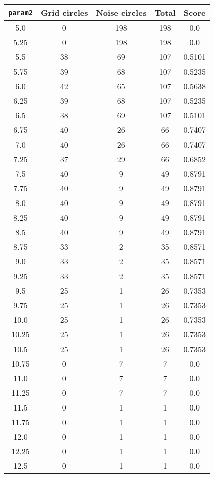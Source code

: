 \documentclass[letterpaper, 12pt]{article}
\begin{document}
\begin{longtable}{|c|c|c|c|c|}
\hline
\textbf{\texttt{param2}} & \textbf{Grid circles} & \textbf{Noise circles} & \textbf{Total} & \textbf{Score} \\
\hline
5.0 & 0 & 198 & 198 & 0.0 \\
\hline
5.25 & 0 & 198 & 198 & 0.0 \\
\hline
5.5 & 38 & 69 & 107 & 0.5101 \\
\hline
5.75 & 39 & 68 & 107 & 0.5235 \\
\hline
6.0 & 42 & 65 & 107 & 0.5638 \\
\hline
6.25 & 39 & 68 & 107 & 0.5235 \\
\hline
6.5 & 38 & 69 & 107 & 0.5101 \\
\hline
6.75 & 40 & 26 & 66 & 0.7407 \\
\hline
7.0 & 40 & 26 & 66 & 0.7407 \\
\hline
7.25 & 37 & 29 & 66 & 0.6852 \\
\hline
7.5 & 40 & 9 & 49 & 0.8791 \\
\hline
7.75 & 40 & 9 & 49 & 0.8791 \\
\hline
8.0 & 40 & 9 & 49 & 0.8791 \\
\hline
8.25 & 40 & 9 & 49 & 0.8791 \\
\hline
8.5 & 40 & 9 & 49 & 0.8791 \\
\hline
8.75 & 33 & 2 & 35 & 0.8571 \\
\hline
9.0 & 33 & 2 & 35 & 0.8571 \\
\hline
9.25 & 33 & 2 & 35 & 0.8571 \\
\hline
9.5 & 25 & 1 & 26 & 0.7353 \\
\hline
9.75 & 25 & 1 & 26 & 0.7353 \\
\hline
10.0 & 25 & 1 & 26 & 0.7353 \\
\hline
10.25 & 25 & 1 & 26 & 0.7353 \\
\hline
10.5 & 25 & 1 & 26 & 0.7353 \\
\hline
10.75 & 0 & 7 & 7 & 0.0 \\
\hline
11.0 & 0 & 7 & 7 & 0.0 \\
\hline
11.25 & 0 & 7 & 7 & 0.0 \\
\hline
11.5 & 0 & 1 & 1 & 0.0 \\
\hline
11.75 & 0 & 1 & 1 & 0.0 \\
\hline
12.0 & 0 & 1 & 1 & 0.0 \\
\hline
12.25 & 0 & 1 & 1 & 0.0 \\
\hline
12.5 & 0 & 1 & 1 & 0.0 \\

\end{longtable}
\end{document}
